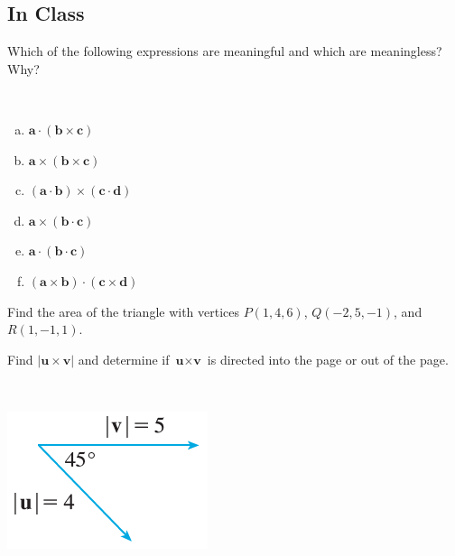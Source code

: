 \documentclass[notes]{subfiles}
\begin{document}
	\subsection*{In Class}
		\begin{ex}
			Which of the following expressions are meaningful and which are meaningless?  Why?
		\end{ex}\\
		\begin{minipage}{7in}
			\begin{multicols*}{2}
				\begin{enumerate}[(a)]
					\setlength\itemsep{50pt}
					\item $\textbf{a}\cdot (\textbf{b}\times \textbf{c})$
					\item $\textbf{a}\times (\textbf{b}\times \textbf{c})$
					\item $(\textbf{a}\cdot \textbf{b})\times (\textbf{c}\cdot \textbf{d})$
						\columnbreak
					\item $\textbf{a}\times (\textbf{b}\cdot \textbf{c})$
					\item $\textbf{a}\cdot (\textbf{b}\cdot \textbf{c})$
					\item $(\textbf{a}\times\textbf{b})\cdot (\textbf{c}\times\textbf{d})$
				\end{enumerate}
					\raggedcolumns
			\end{multicols*}
		\end{minipage}
			
		\begin{ex}
			Find the area of the triangle with vertices $P(1,4,6)$, $Q(-2,5,-1)$, and $R(1,-1,1)$.
		\end{ex}
		
		\begin{ex}
			Find $|\textbf{u}\times \textbf{v}|$ and determine if $\textbf{u}\times\textbf{v}$ is directed into the page or out of the page.
		\end{ex}\\
		\begin{flushleft}
			\includegraphics[scale = 1.25]{124_1.png}
		\end{flushleft}
		
\end{document}
